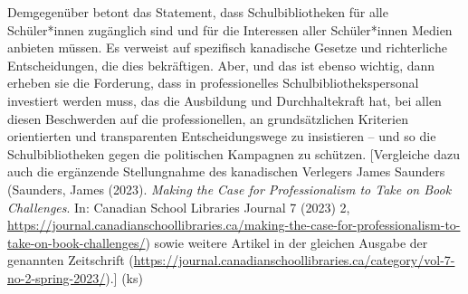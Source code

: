 \documentclass[a4paper,
fontsize=11pt,
oneside,
numbers=noperiodatend,
parskip=half-,
bibliography=totoc,
final
]{scrartcl}
\begin{document}
Demgegenüber betont das Statement, dass Schulbibliotheken für alle
Schüler*innen zugänglich sind und für die Interessen aller Schüler*innen
Medien anbieten müssen. Es verweist auf spezifisch kanadische Gesetze
und richterliche Entscheidungen, die dies bekräftigen. Aber, und das ist
ebenso wichtig, dann erheben sie die Forderung, dass in professionelles
Schulbibliothekspersonal investiert werden muss, das die Ausbildung und
Durchhaltekraft hat, bei allen diesen Beschwerden auf die
professionellen, an grundsätzlichen Kriterien orientierten und
transparenten Entscheidungswege zu insistieren -- und so die
Schulbibliotheken gegen die politischen Kampagnen zu schützen.
{[}Vergleiche dazu auch die ergänzende Stellungnahme des kanadischen
Verlegers James Saunders (Saunders, James (2023). \emph{Making the Case
for Professionalism to Take on Book Challenges}. In: Canadian School
Libraries Journal 7 (2023) 2,
\url{https://journal.canadianschoollibraries.ca/making-the-case-for-professionalism-to-take-on-book-challenges/})
sowie weitere Artikel in der gleichen Ausgabe der genannten Zeitschrift
(\url{https://journal.canadianschoollibraries.ca/category/vol-7-no-2-spring-2023/}).{]}
(ks)

\end{document}
